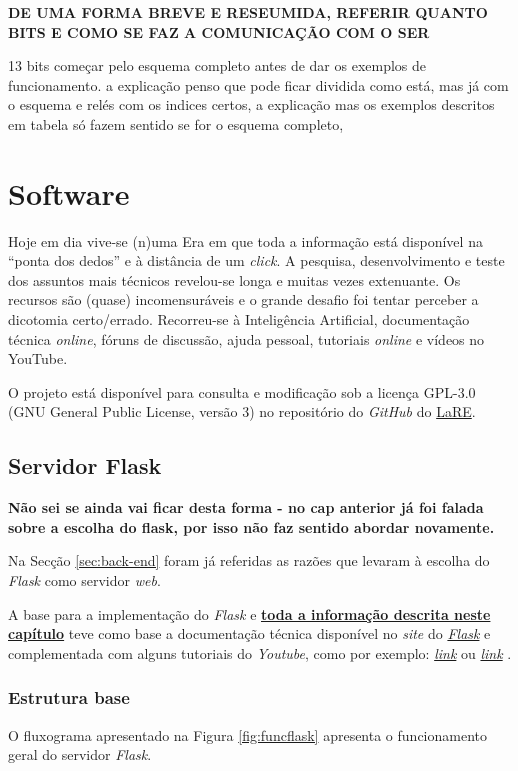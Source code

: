 \textbf{DE UMA FORMA BREVE E RESEUMIDA, REFERIR QUANTO BITS E COMO SE FAZ A COMUNICAÇÃO COM O SER}

13 bits começar pelo esquema completo antes de dar os exemplos de funcionamento. a explicação penso que pode ficar dividida como está, mas já com o esquema e relés com os indices certos, a explicação mas os exemplos descritos em tabela só fazem sentido se for o esquema completo,

\section{Software}
Hoje em dia vive-se (n)uma Era em que toda a informação está disponível na ``ponta dos dedos'' e à distância de um \textit{click}. A pesquisa, desenvolvimento e teste dos assuntos mais técnicos revelou-se longa e muitas vezes extenuante. Os recursos são (quase) incomensuráveis e o grande desafio foi tentar perceber a dicotomia certo/errado. Recorreu-se à Inteligência Artificial, documentação técnica \textit{online}, fóruns de discussão, ajuda pessoal, tutoriais \textit{online} e vídeos no YouTube.

O projeto está disponível para consulta e modificação sob a licença GPL-3.0 (GNU General Public License, versão 3) no repositório do \textit{GitHub} do \href{https://github.com/eddygrinder/LaRE}{LaRE}. 


\subsection{Servidor Flask}
\label{sec:flask}
\textbf{Não sei se ainda vai ficar desta forma - no cap anterior já foi falada sobre a escolha do flask, por isso não faz sentido abordar novamente.}

Na Secção \ref{sec:back-end} foram já referidas as razões que levaram à escolha do \textit{Flask} como servidor \textit{web}. 

A base para a implementação do \textit{Flask} e \underline{\textbf{toda a informação descrita neste}} \underline{\textbf{capítulo}} teve como base a documentação técnica disponível no \textit{site} do \href{https://flask.palletsprojects.com/en/3.0.x/}{\textit{Flask}} e complementada com alguns tutoriais do \textit{Youtube}, como por exemplo: \href{https://www.youtube.com/watch?v=dam0GPOAvVI}{\textit{link}} ou \href{https://www.youtube.com/watch?v=bB6Yyh7nUl4}{\textit{link}} .

\subsubsection{Estrutura base}
O fluxograma apresentado na Figura \ref{fig:funcflask} apresenta o funcionamento geral do servidor \textit{Flask}.

